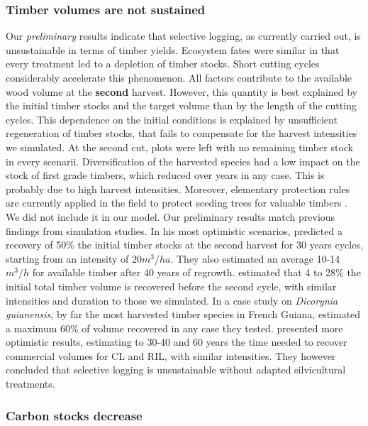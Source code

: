 \documentclass[12pt,]{article}
\theoremstyle{definition}
\theoremstyle{definition}
\theoremstyle{definition}
\theoremstyle{remark}
\begin{document}
\subsubsection{Timber volumes are not
sustained}\label{timber-volumes-are-not-sustained}

Our \emph{preliminary} results indicate that selective logging, as
currently carried out, is unsustainable in terms of timber yields.
Ecosystem fates were similar in that every treatment led to a depletion
of timber stocks. Short cutting cycles considerably accelerate this
phenomenon. All factors contribute to the available wood volume at the
\textbf{second} harvest. However, this quantity is best explained by the
initial timber stocks and the target volume than by the length of the
cutting cycles. This dependence on the initial conditions is explained
by unsufficient regeneration of timber stocks, that fails to compensate
for the harvest intensities we simulated. At the second cut, plots were
left with no remaining timber stock in every scenarii. Diversification
of the harvested species had a low impact on the stock of first grade
timbers, which reduced over years in any case. This is probably due to
high harvest intensities. Moreover, elementary protection rules are
currently applied in the field to protect seeding trees for valuable
timbers \citep{Guitet2011}. We did not include it in our model. Our
preliminary results match previous findings from simulation studies. In
his most optimistic scenarios, \citet{Sist2007} predicted a recovery of
50\(\%\) the initial timber stocks at the second harvest for 30 years
cycles, starting from an intensity of \(20 m^3/ha\). They also estimated
an average 10-14 \(m^3/h\) for available timber after 40 years of
regrowth. \citet{Dauber2005} estimated that 4 to 28\(\%\) the initial
total timber volume is recovered before the second cycle, with similar
intensities and duration to those we simulated. In a case study on
\emph{Dicorynia guianensis}, by far the most harvested timber species in
French Guiana, \citet{Gourlet-Fleury2005a} estimated a maximum 60\(\%\)
of volume recovered in any case they tested. \citet{Valle2007} presented
more optimistic results, estimating to 30-40 and 60 years the time
needed to recover commercial volumes for CL and RIL, with similar
intensities. They however concluded that selective logging is
unsustainable without adapted silvicultural treatments.

\subsubsection{Carbon stocks decrease}\label{carbon-stocks-decrease}
\end{document}
